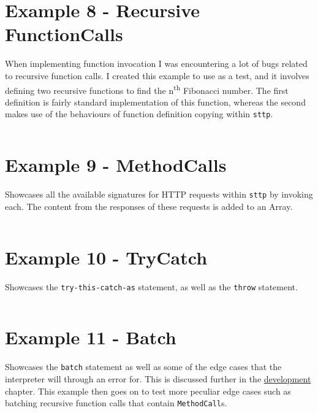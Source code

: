 \documentclass[]{full}
\theoremstyle{definition}
\begin{document}
\inputminted[autogobble, breaklines, tabsize=4]{text}{../../src/_examples/example_07/example_07.sttp}

\section{Example 8 - Recursive FunctionCalls}
\label{appendix:sttp-examples-8}

When implementing function invocation I was encountering a lot of bugs related to recursive function calls. I created this example to use as a test, and it involves defining two recursive functions to find the n\textsuperscript{th} Fibonacci number. The first definition is fairly standard implementation of this function, whereas the second makes use of the behaviours of function definition copying within \verb|sttp|.

\inputminted[autogobble, breaklines, tabsize=4]{text}{../../src/_examples/example_08/example_08.sttp}

\section{Example 9 - MethodCalls}
\label{appendix:sttp-examples-9}

Showcases all the available signatures for HTTP requests within \verb|sttp| by invoking each. The content from the responses of these requests is added to an Array.

\inputminted[autogobble, breaklines, tabsize=4]{text}{../../src/_examples/example_09/example_09.sttp}

\section{Example 10 - TryCatch}
\label{appendix:sttp-examples-10}

Showcases the \verb|try-this-catch-as| statement, as well as the \verb|throw| statement.

\inputminted[autogobble, breaklines, tabsize=4]{text}{../../src/_examples/example_10/example_10.sttp}

\section{Example 11 - Batch}
\label{appendix:sttp-examples-11}

Showcases the \verb|batch| statement as well as some of the edge cases that the interpreter will through an error for. This is discussed further in the \hyperref[chap:eval-ast-nodes-batch-edge-cases]{development} chapter. This example then goes on to test more peculiar edge cases such as batching recursive function calls that contain \verb|MethodCall|s.
\end{document}
